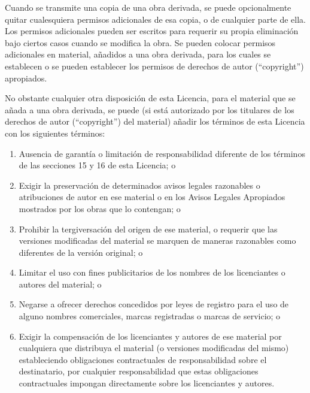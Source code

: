 {\begin{enumerate}
Cuando se transmite una copia de una obra derivada, se puede
opcionalmente quitar cualesquiera permisos adicionales de esa copia,
o de cualquier parte de ella. Los permisos adicionales pueden ser
escritos para requerir su propia eliminaci\'{o}n bajo ciertos casos cuando
se modifica la obra. Se pueden colocar permisos adicionales en material,
a\~nadidos a una obra derivada, para los cuales se establecen o se 
pueden establecer los permisos de derechos de autor (``copyright'') apropiados.

No obstante cualquier otra disposici\'{o}n de esta Licencia, para el
material que se a\~nada a una obra derivada, se puede (si est\'{a} autorizado
por los titulares de los derechos de autor (``copyright'') del material) a\~nadir los t\'{e}rminos de esta 
Licencia con los siguientes t\'{e}rminos:
  \begin{enumerate}
  \item Ausencia de garant\'{i}a o limitaci\'{o}n de responsabilidad diferente de 
    los t\'{e}rminos de las secciones 15 y 16 de esta Licencia; o

  \item Exigir la preservaci\'{o}n de determinados avisos legales razonables o
     atribuciones de autor en ese material o en los Avisos Legales 
     Apropiados mostrados por los obras que lo contengan; o

  \item Prohibir la tergiversaci\'{o}n del origen de ese material, o requerir 
    que las versiones modificadas del material se marquen de maneras 
    razonables como diferentes de la versi\'{o}n original; o

  \item Limitar el uso con fines publicitarios de los nombres de los 
    licenciantes o autores del material; o

  \item Negarse a ofrecer derechos concedidos por leyes de registro para el
    uso de alguno nombres comerciales, marcas registradas o marcas de servicio; o

  \item Exigir la compensaci\'{o}n de los licenciantes y autores de ese material por 
    cualquiera que distribuya el material (o versiones modificadas del mismo) 
    estableciendo obligaciones contractuales de responsabilidad sobre el 
    destinatario, por cualquier responsabilidad que estas obligaciones 
    contractuales impongan directamente sobre los licenciantes y autores.
  \end{enumerate}


\end{enumerate}}
